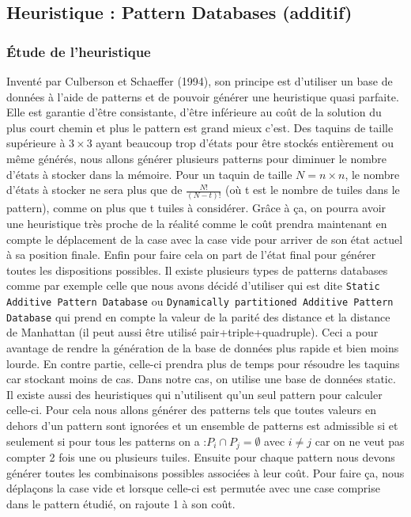 \documentclass[a4paper, 12pt]{article}
\begin{document}
\subsection{Heuristique : Pattern Databases (additif)}


\subsubsection{Étude de l'heuristique}

Inventé par Culberson et Schaeffer (1994), son principe est d'utiliser un base de données à l'aide de patterns et de pouvoir générer une heuristique quasi parfaite. Elle est garantie d'être consistante, d'être inférieure au coût de la solution du plus court chemin et plus le pattern est grand mieux c'est. Des taquins de taille supérieure à $3 \times 3$ ayant beaucoup trop d'états pour être stockés entièrement ou même générés, nous allons générer plusieurs patterns pour diminuer le nombre d'états à stocker dans la mémoire.
Pour un taquin de taille $N = n \times n$, le nombre d'états à stocker ne sera plus que de $\frac{N!}{(N-t)!}$ (où t est le nombre de tuiles dans le pattern), comme on plus que t tuiles à considérer. Grâce à ça, on pourra avoir une heuristique très proche de la réalité comme le coût prendra maintenant en compte le déplacement de la case avec la case vide pour arriver de son état actuel à sa position finale.
Enfin pour faire cela on part de l'état final pour générer toutes les dispositions possibles.
Il existe plusieurs types de patterns databases comme par exemple celle que nous avons décidé d'utiliser qui est dite \lstinline{Static Additive Pattern Database} ou \lstinline{Dynamically partitioned Additive Pattern Database} qui prend en compte la valeur de la parité des distance et la distance de Manhattan (il peut aussi être utilisé pair+triple+quadruple). Ceci a pour avantage de rendre la génération de la base de données plus rapide et bien moins lourde.
En contre partie, celle-ci prendra plus de temps pour résoudre les taquins car stockant moins de cas. Dans notre cas, on utilise une base de données static. Il existe aussi des heuristiques qui n'utilisent qu'un seul pattern pour calculer celle-ci.
Pour cela nous allons générer des patterns tels que toutes valeurs en dehors d'un pattern sont ignorées et un ensemble de patterns est admissible si et seulement si pour tous les patterns on a :$P_{i} \cap P_{j} = \emptyset$ avec $i \neq j$ car on ne veut pas compter 2 fois une ou plusieurs tuiles. Ensuite pour chaque pattern nous devons générer toutes les combinaisons possibles associées à leur coût. Pour faire ça, nous déplaçons la case vide et lorsque celle-ci est permutée avec une case comprise dans le pattern étudié, on rajoute 1 à son coût.
\end{document}
